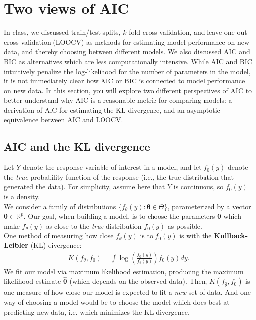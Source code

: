 \documentclass[11pt]{article}
\begin{document}
\section{Two views of AIC}

In class, we discussed train/test splits, $k$-fold cross validation, and leave-one-out cross-validation (LOOCV) as methods for estimating model performance on new data, and thereby choosing between different models. We also discussed AIC and BIC as alternatives which are less computationally intensive. While AIC and BIC intuitively penalize the log-likelihood for the number of parameters in the model, it is not immediately clear how AIC or BIC is connected to model performance on new data. In this section, you will explore two different perspectives of AIC to better understand why AIC is a reasonable metric for comparing models: a derivation of AIC for estimating the KL divergence, and an asymptotic equivalence between AIC and LOOCV.

\subsection*{AIC and the KL divergence}

Let $Y$ denote the response variable of interest in a model, and let $f_0(y)$ denote the \textit{true} probability function of the response (i.e., the true distribution that generated the data). For simplicity, assume here that $Y$ is continuous, so $f_0(y)$ is a density.\\

\noindent We consider a family of distributions $\{f_{\theta}(y) : \bm{\theta} \in \Theta \}$, parameterized by a vector $\bm{\theta} \in \mathbb{R}^p$. Our goal, when building a model, is to choose the parameters $\bm{\theta}$ which make $f_\theta(y)$ as close to the \textit{true} distribution $f_0(y)$ as possible.\\

\noindent One method of measuring how close $f_\theta(y)$ is to $f_0(y)$ is with the \textbf{Kullback-Leibler} (KL) divergence:
\begin{align}
K(f_\theta, f_0) = \int \log \left( \frac{f_0(y)}{f_\theta(y)} \right) f_0(y) dy.
\end{align}
We fit our model via maximum likelihood estimation, producing the maximum likelihood estimate $\widehat{\bm{\theta}}$ (which depends on the observed data). Then, $K(f_{\widehat{\theta}}, f_0)$ is one measure of how close our model is expected to fit a \textit{new} set of data. And one way of choosing a model would be to choose the model which does best at predicting new data, i.e. which minimizes the KL divergence.\\
\end{document}
